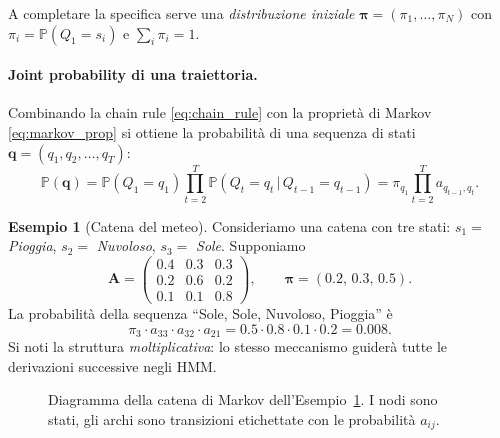 \documentclass[11pt,a4paper,oneside]{book}
\theoremstyle{plain}
\theoremstyle{definition}
\newtheorem{esempio}[teorema]{Esempio}
\theoremstyle{remark}
\newcommand{\Prob}{\mathbb{P}}
\newcommand{\Amat}{\mathbf{A}}               %
\newcommand{\initvec}{\boldsymbol{\pi}}      %
\newcommand{\Nstates}{N}                     %
\newcommand{\Tlen}{T}                        %
\newcommand{\seqstates}{\mathbf{q}}          %
\newcommand{\given}{\,\vert\,}
\begin{document}
A completare la specifica serve una \emph{distribuzione iniziale}
$\initvec=(\pi_1,\dots,\pi_{\Nstates})$ con
$\pi_i=\Prob(Q_1=s_i)$ e $\sum_i \pi_i = 1$.

\paragraph{Joint probability di una traiettoria.}
Combinando la chain rule \eqref{eq:chain_rule} con la proprietà di
Markov \eqref{eq:markov_prop} si ottiene la probabilità di una
sequenza di stati $\seqstates = (q_1,q_2,\dots,q_{\Tlen})$:
\begin{equation}
    \Prob(\seqstates) =
    \Prob(Q_1=q_1)\prod_{t=2}^{\Tlen}\Prob(Q_t=q_t\given Q_{t-1}=q_{t-1})
    = \pi_{q_1}\prod_{t=2}^{\Tlen} a_{q_{t-1},q_t}.
    \label{eq:joint_chain}
\end{equation}

\begin{esempio}[Catena del meteo]
\label{ex:weather_chain}
Consideriamo una catena con tre stati: $s_1=$ \emph{Pioggia}, $s_2=$
\emph{Nuvoloso}, $s_3=$ \emph{Sole}. Supponiamo
\[
\Amat = \begin{pmatrix}
0.4 & 0.3 & 0.3\\
0.2 & 0.6 & 0.2\\
0.1 & 0.1 & 0.8
\end{pmatrix},\qquad
\initvec=(0.2,\,0.3,\,0.5).
\]
La probabilità della sequenza ``Sole, Sole, Nuvoloso, Pioggia'' è
\[
\pi_3 \cdot a_{33}\cdot a_{32}\cdot a_{21}
= 0.5 \cdot 0.8 \cdot 0.1 \cdot 0.2 = 0.008.
\]
Si noti la struttura \emph{moltiplicativa}: lo stesso meccanismo
guiderà tutte le derivazioni successive negli HMM.
\end{esempio}

\begin{figure}[h!]
\centering
{}
\caption{Diagramma della catena di Markov dell'Esempio~\ref{ex:weather_chain}.
I nodi sono stati, gli archi sono transizioni etichettate con le
probabilità $a_{ij}$.}
\label{fig:weather_chain}
\end{figure}
\end{document}
